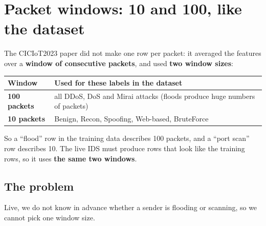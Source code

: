 \documentclass[11pt]{article}
\begin{document}
\section{Packet windows: 10 and 100, like the dataset}
The CICIoT2023 paper did not make one row per packet: it averaged the features over a \textbf{window of consecutive packets}, and used
\textbf{two window sizes}:
\begin{center}
\begin{tabular}{@{}l >{\raggedright\arraybackslash}p{10cm}@{}}
\toprule
\textbf{Window} & \textbf{Used for these labels in the dataset} \\
\midrule
\textbf{100 packets} & all DDoS, DoS and Mirai attacks (floods produce huge numbers of packets) \\
\textbf{10 packets} & Benign, Recon, Spoofing, Web-based, BruteForce \\
\bottomrule
\end{tabular}
\end{center}
So a ``flood'' row in the training data describes 100 packets, and a ``port scan'' row describes 10. The live IDS must produce rows
that look like the training rows, so it uses \textbf{the same two windows}.

\subsection*{The problem}
Live, we do not know in advance whether a sender is flooding or scanning, so we cannot pick one window size.
\end{document}
